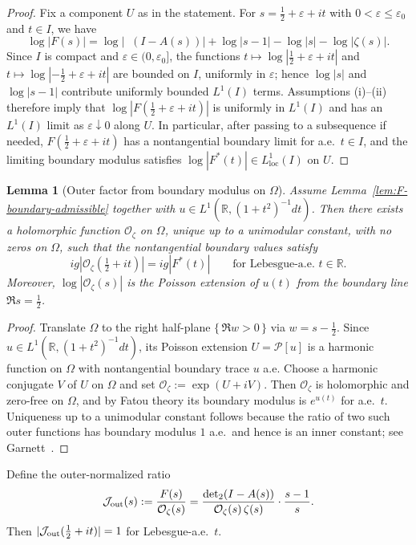 \documentclass[11pt]{amsart}
\newtheorem{lemma}[theorem]{Lemma}
\theoremstyle{definition}
\theoremstyle{remark}
\DeclareMathOperator{\dettwo}{det_2}
\begin{document}
\begin{proof}
Fix a component $U$ as in the statement. For $s=\tfrac12+\varepsilon+it$ with $0<\varepsilon\le \varepsilon_0$ and $t\in I$, we have
\[
\log|F(s)|=\log|\dettwo(I-A(s))|+\log|s-1|-\log|s|-\log|\zeta(s)|.
\]
Since $I$ is compact and $\varepsilon\in(0,\varepsilon_0]$, the functions $t\mapsto \log|\tfrac12+\varepsilon+it|$ and $t\mapsto \log|-\tfrac12+\varepsilon+it|$
are bounded on $I$, uniformly in $\varepsilon$; hence $\log|s|$ and $\log|s-1|$ contribute uniformly bounded $L^1(I)$ terms.
Assumptions (i)--(ii) therefore imply that $\log|F(\tfrac12+\varepsilon+it)|$ is uniformly in $L^1(I)$ and has an $L^1(I)$ limit as $\varepsilon\downarrow0$ along $U$.
In particular, after passing to a subsequence if needed, $F(\tfrac12+\varepsilon+it)$ has a nontangential boundary limit for a.e.\ $t\in I$, and the limiting boundary modulus satisfies
$\log|F^*(t)|\in L^1_{\mathrm{loc}}(I)$ on $U$.
\end{proof}
\begin{lemma}[Outer factor from boundary modulus on $\Omega$]\label{lem:outer-factor-halfplane}
Assume Lemma~\ref{lem:F-boundary-admissible} together with $u\in L^1(\mathbb R,(1+t^2)^{-1}dt)$.
Then there exists a holomorphic function $\mathcal O_\zeta$ on $\Omega$, unique up to a unimodular constant,
with no zeros on $\Omega$, such that the nontangential boundary values satisfy
\[
  ig|\mathcal O_\zeta(\tfrac12+it)|=ig|F^*(t)|\qquad\text{for Lebesgue-a.e.\ }t\in\mathbb R.
\]
Moreover, $\log|\mathcal O_\zeta(s)|$ is the Poisson extension of $u(t)$ from the boundary line $\Re s=\tfrac12$.
\end{lemma}
\begin{proof}
Translate $\Omega$ to the right half-plane $\{\,\Re w>0\,\}$ via $w=s-\tfrac12$.
Since $u\in L^1(\mathbb R,(1+t^2)^{-1}dt)$, its Poisson extension $U=\mathcal P[u]$ is a harmonic function on $\Omega$
with nontangential boundary trace $u$ a.e.
Choose a harmonic conjugate $V$ of $U$ on $\Omega$ and set $\mathcal O_\zeta:=\exp(U+iV)$.
Then $\mathcal O_\zeta$ is holomorphic and zero-free on $\Omega$, and by Fatou theory its boundary modulus is $e^{u(t)}$
for a.e.\ $t$. Uniqueness up to a unimodular constant follows because the ratio of two such outer functions has boundary modulus $1$ a.e.\ and hence is an inner constant; see Garnett~\cite[Ch.~II]{GarnettBAF}.
\end{proof}

Define the outer-normalized ratio
\begin{equation}\label{eq:J-out}
  \mathcal J_{\rm out}(s):=\frac{F(s)}{\mathcal O_\zeta(s)}
  =\frac{\dettwo(I-A(s))}{\mathcal O_\zeta(s)\,\zeta(s)}\cdot\frac{s-1}{s}.
\end{equation}
Then $|\mathcal J_{\rm out}(\tfrac12+it)|=1$ for Lebesgue-a.e.\ $t$.
\end{document}
